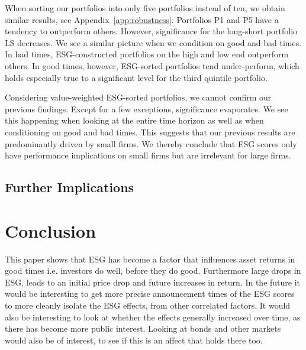 \documentclass[11pt]{article}
\begin{document}
When sorting our portfolios into only five portfolios instead of ten, we obtain similar results, see Appendix~\ref{app:robustness}. Portfolios P1 and P5 have a tendency to outperform others. However, significance for the long-short portfolio LS decreases. We see a similar picture when we condition on good and bad times. In bad times, ESG-constructed portfolios on the high and low end outperform others. In good times, however, ESG-sorted portfolios tend under-perform, which holds especially true to a significant level for the third quintile portfolio. 

Considering value-weighted ESG-sorted portfolios, we cannot confirm our previous findings. Except for a few exceptions, significance evaporates. We see this happening when looking at the entire time horizon as well as when conditioning on good and bad times. This suggests that our previous results are predominantly driven by small firms. We thereby conclude that ESG scores only have performance implications on small firms but are irrelevant for large firms.

\subsection{Further Implications}

\section{Conclusion}
This paper shows that ESG has become a factor that influences asset returns in good times i.e. investors do well, before they do good. Furthermore large drops in ESG, leads to an initial price drop and future increases in return. In the future it would be interesting to get more precise announcement times of the ESG scores to more cleanly isolate the ESG effects, from other correlated factors. It would also be interesting to look at whether the effects generally increased over time, as there has become more public interest. Looking at bonds and other markets would also be of interest, to see if this is an affect that holds there too.


\clearpage


%

\newpage
\begin{appendices}


\end{appendices}
\end{document}
